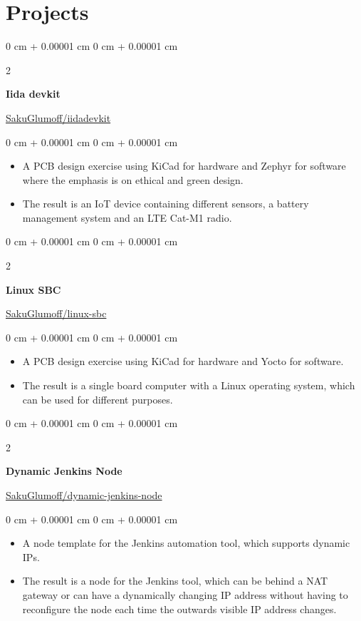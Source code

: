 \documentclass{article}
\newenvironment{highlights}{
    \begin{itemize}[
        topsep=0.10 cm,
        parsep=0.10 cm,
        partopsep=0pt,
        itemsep=0pt,
        leftmargin=0 cm + 10pt
    ]
}{
    \end{itemize}
}
\newenvironment{onecolentry}{
    \begin{adjustwidth}{
        0 cm + 0.00001 cm
    }{
        0 cm + 0.00001 cm
    }
}{
    \end{adjustwidth}
}
\newenvironment{twocolentry}[2][]{
    \onecolentry
    \def\secondColumn{#2}
    \setcolumnwidth{\fill, 4.5 cm}
    \begin{paracol}{2}
}{
    \switchcolumn \raggedleft \secondColumn
    \end{paracol}
    \endonecolentry
}
\begin{document}
  \section{Projects}
    \begin{twocolentry}{
      \href{https://github.com/SakuGlumoff/iida-devkit}{ SakuGlumoff/iida\-devkit}
    }
    \textbf{Iida devkit}
    \end{twocolentry}
    \vspace{0.1 cm}
    \begin{onecolentry}
      \begin{highlights}
        \item A PCB design exercise using KiCad for hardware and Zephyr for software where the emphasis is on ethical and green design.
        \item The result is an IoT device containing different sensors, a battery management system and an LTE Cat-M1 radio.
      \end{highlights}
    \end{onecolentry}
    \vspace{0.3 cm}
    \begin{twocolentry}{
      \href{https://github.com/SakuGlumoff/linux-sbc}{ SakuGlumoff/linux-sbc}
    }
    \textbf{Linux SBC}
    \end{twocolentry}
    \vspace{0.1 cm}
    \begin{onecolentry}
      \begin{highlights}
        \item A PCB design exercise using KiCad for hardware and Yocto for software.
        \item The result is a single board computer with a Linux operating system, which can be used for different purposes.
      \end{highlights}
    \end{onecolentry}
    \vspace{0.3 cm}
    \begin{twocolentry}{
      \href{https://github.com/SakuGlumoff/dynamic-jenkins-node}{\faIcon{github} SakuGlumoff/dynamic-jenkins-node}
    }
    \textbf{Dynamic Jenkins Node}
    \end{twocolentry}
    \vspace{0.1 cm}
    \begin{onecolentry}
      \begin{highlights}
        \item A node template for the Jenkins automation tool, which supports dynamic IPs.
        \item The result is a node for the Jenkins tool, which can be behind a NAT gateway or can have a dynamically changing IP address without having to reconfigure the node each time the outwards visible IP address changes.
      \end{highlights}
    \end{onecolentry}
    \vspace{0.3 cm}
\end{document}
